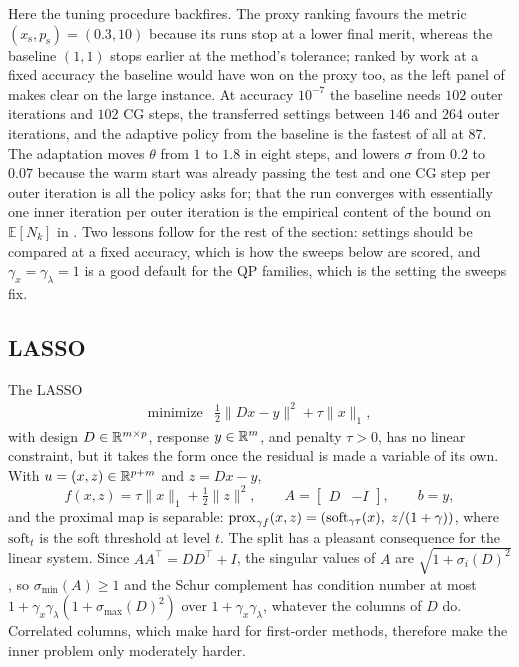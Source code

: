 \documentclass[11pt]{article}
\begin{document}
Here the tuning procedure backfires.
The proxy ranking favours the metric $(x_\mathrm{s}, p_\mathrm{s}) = (0.3, 10)$ because its runs stop at a lower final merit, whereas the baseline $(1, 1)$ stops earlier at the method's tolerance; ranked by work at a fixed accuracy the baseline would have won on the proxy too, as the left panel of  makes clear on the large instance.
At accuracy $10^{-7}$ the baseline needs $102$ outer iterations and $102$ CG steps, the transferred settings between $146$ and $264$ outer iterations, and the adaptive policy from the baseline is the fastest of all at $87$.
The adaptation moves $\theta$ from $1$ to $1.8$ in eight steps, and lowers $\sigma$ from $0.2$ to $0.07$ because the warm start was already passing the test and one CG step per outer iteration is all the policy asks for; that the run converges with essentially one inner iteration per outer iteration is the empirical content of the bound on $\mathbb{E}[N_k]$ in .
Two lessons follow for the rest of the section: settings should be compared at a fixed accuracy, which is how the sweeps below are scored, and $\gamma_x = \gamma_\lambda = 1$ is a good default for the QP families, which is the setting the sweeps fix.

\subsection{LASSO}\label{sec:experiments-lasso}
The LASSO
\begin{equation}\label{eq:lasso}
    \begin{array}{ll}
        \text{minimize} & \frac{1}{2}\|Dx - y\|^2 + \tau \|x\|_1,
    \end{array}
\end{equation}
with design $D \in \mathbb{R}^{m \times p}$, response $y \in \mathbb{R}^m$, and penalty $\tau > 0$, has no linear constraint, but it takes the form  once the residual is made a variable of its own.
With $u = (x, z) \in \mathbb{R}^{p + m}$ and $z = Dx - y$,
\begin{equation}\label{eq:lasso-split}
    f(x, z) = \tau\|x\|_1 + \tfrac{1}{2}\|z\|^2,
    \qquad
    A = \begin{bmatrix} D & -I \end{bmatrix},
    \qquad
    b = y,
\end{equation}
and the proximal map is separable: $\mathrm{prox}_{\gamma f}(x, z) = (\mathrm{soft}_{\gamma\tau}(x),\; z/(1 + \gamma))$, where $\mathrm{soft}_t$ is the soft threshold at level $t$.
The split has a pleasant consequence for the linear system.
Since $AA^\top = DD^\top + I$, the singular values of $A$ are $\sqrt{1 + \sigma_i(D)^2}$, so $\sigma_{\min}(A) \geq 1$ and the Schur complement  has condition number at most $1 + \gamma_x\gamma_\lambda(1 + \sigma_{\max}(D)^2)$ over $1 + \gamma_x\gamma_\lambda$, whatever the columns of $D$ do.
Correlated columns, which make  hard for first-order methods, therefore make the inner problem only moderately harder.
\end{document}
